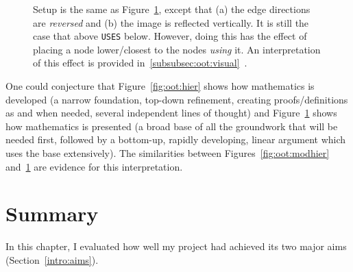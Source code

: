 \begin{figure}[p]
\begin{minipage}{0.5\textwidth-0.5em}
      \caption{Setup is the same as Figure~\ref{fig:oot:hierflip}, except that
      (a) the edge directions are \emph{reversed} and (b) the image is
      reflected vertically. It is still the case that above \texttt{USES} below.
      However, doing this has the effect of placing a node lower/closest to
      the nodes \emph{using} it. An interpretation of this effect is provided
      in~\ref{subsubsec:oot:visual}~.}\label{fig:oot:hierflip}
  \end{minipage}
\end{figure}

One could conjecture that Figure~\ref{fig:oot:hier} shows how mathematics is
developed (a narrow foundation, top-down refinement, creating proofs/definitions
as and when needed, several independent lines of thought) and
Figure~\ref{fig:oot:hierflip} shows how mathematics is presented (a broad base
of all the groundwork that will be needed first, followed by a bottom-up,
rapidly developing, linear argument which uses the base extensively). The
similarities between Figures~\ref{fig:oot:modhier} and~\ref{fig:oot:hierflip}
are evidence for this interpretation.

\newpage%
\section{Summary}

In this chapter, I evaluated how well my project had achieved its two major aims
(Section~\ref{intro:aims}).

